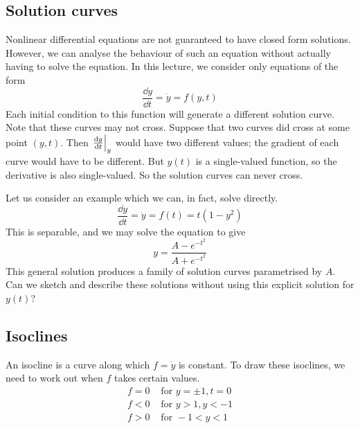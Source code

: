\subsection{Solution curves}
Nonlinear differential equations are not guaranteed to have closed form solutions.
However, we can analyse the behaviour of such an equation without actually having to solve the equation.
In this lecture, we consider only equations of the form
\[
	\frac{\dd{y}}{\dd{t}} = \dot y = f(y, t)
\]
Each initial condition to this function will generate a different solution curve.
Note that these curves may not cross.
Suppose that two curves did cross at some point \((y, t)\).
Then \(\eval{\frac{\dd{y}}{\dd{t}}}_y\) would have two different values; the gradient of each curve would have to be different.
But \(y(t)\) is a single-valued function, so the derivative is also single-valued.
So the solution curves can never cross.

Let us consider an example which we can, in fact, solve directly.
\[
	\frac{\dd{y}}{\dd{t}} = \dot y = f(t) = t(1 - y^2)
\]
This is separable, and we may solve the equation to give
\[
	y = \frac{A - e^{-t^2}}{A + e^{-t^2}}
\]
This general solution produces a family of solution curves parametrised by \(A\).
Can we sketch and describe these solutions without using this explicit solution for \(y(t)\)?

\subsection{Isoclines}
An isocline is a curve along which \(f = \dot y\) is constant.
To draw these isoclines, we need to work out when \(f\) takes certain values.
\begin{align*}
	f = 0 & \text{ for } y = \pm 1, t = 0 \\
	f < 0 & \text{ for } y > 1, y < -1    \\
	f > 0 & \text{ for } -1 < y < 1
\end{align*}

